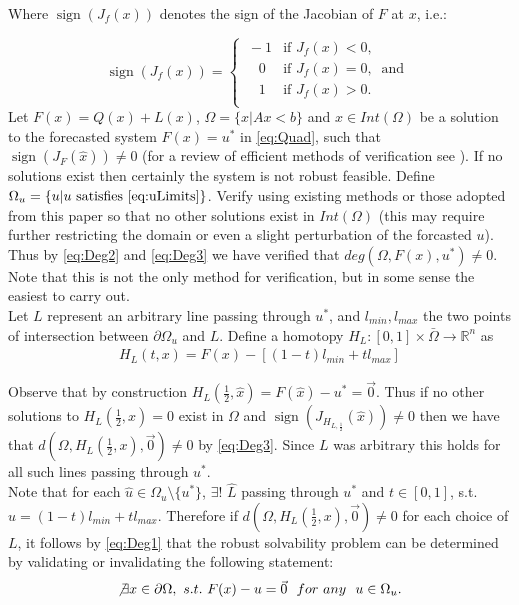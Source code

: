 \documentclass[11pt]{article}
\theoremstyle{plain}
\theoremstyle{definition}
\theoremstyle{remark}
\begin{document}
Where $\operatorname{sign}\left(J_f(x)\right)$ denotes the sign of the Jacobian of $F$ at $x$, i.e.:

\[\operatorname{sign}\left(J_f(x)\right)=   \left\{
\begin{array}{ll}
       \ -1   & \mbox{if } J_f(x)< 0, \\
      \quad 0 & \mbox{if } J_f(x)= 0,~\mbox{ and } \\
      \quad 1 & \mbox{if } J_f(x)> 0. \\
\end{array} 
\right. \]
Let $F(x)=Q(x)+L(x)$, $\Omega=\{x| Ax< b\}$ and $\hat{x}\in Int(\Omega)$ be a solution to the forecasted system $F(x)=u^*$ in \ref{eq:Quad}, such that $\operatorname{sign}\left(J_{F}(\hat{x})\right)\neq 0$ (for a review of efficient methods of verification see \cite{GRIEWANK2014}). 
If no solutions exist then certainly the system is not robust feasible. Define $\Omega_u=\{u| u\text{ satisfies }\ref{eq:uLimits}\}$.
Verify using existing methods or those adopted from this paper so that no other solutions exist in $Int(\Omega)$ (this may require further restricting the domain or even a slight perturbation of the forcasted $u$). Thus by \ref{eq:Deg2} and \ref{eq:Deg3} we have verified that $deg\left(\Omega, F(x), u^*\right)\neq 0$. Note that this is not the only method for verification, but in some sense the easiest to carry out. \\

Let $L$ represent an arbitrary line passing through $u^*$, and $l_{min},l_{max}$ the two points of intersection between $\partial\Omega_u$ and $L$. 
Define a homotopy $H_L : [0,1]\times\bar{\Omega}\rightarrow\mathbb{R}^n$ as 
\begin{align}
H_L(t,x) = F(x)-\left[(1-t)l_{min}+tl_{max}\right] \label{eq:Homo}
\end{align}

Observe that by construction $H_L\left(\frac{1}{2},\hat{x}\right)=F(\hat{x})-u^*=\vec{0}$. Thus if no other solutions to $H_L\left(\frac{1}{2},x\right)=0$ exist in $\Omega$ and $\operatorname{sign}\left(J_{H_{L,\frac{1}{2}}}(\hat{x})\right)\neq 0$ then we have that $d(\Omega,H_L\left(\frac{1}{2},x\right),\vec{0})\neq 0$ by \ref{eq:Deg3}. Since $L$ was arbitrary this holds for all such lines passing through $u^*$.\\
Note that for each $\hat{u}\in\Omega_u\setminus\{u^*\}$, $\exists !$ $\hat{L}$ passing through $u^*$ and $t\in[0,1]$,  s.t. $\hat{u}=(1-t)l_{min}+tl_{max}$. Therefore if $d(\Omega,H_L\left(\frac{1}{2},x\right),\vec{0})\neq 0$ for each choice of $L$, it follows by \ref{eq:Deg1} that the robust solvability problem can be determined by validating or invalidating the following statement:
\begin{align}
\not\exists x\in\partial\Omega, \ s.t. \ F(x)-u=\vec{0}	 \ \ for \ any \ \ u\in\Omega_u. \label{eq:RSForm}
\end{align}
\end{document}
